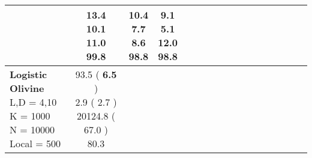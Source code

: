 \documentclass[9pt]{article}
\begin{document}
\begin{landscape}
\begin{longtable}{ l | c c c c | c c c c | c c c c | c c c c |}
             &
                            \makecell{              13.4
     \\
            {\footnotesize             10.1
    } \\  {\footnotesize             11.0
     } \\
            {\small \textcolor[rgb]{ 0.204 , 0.696 , 0.1} {99.8  }
} }
             &                         \makecell{              10.4
     \\
            {\footnotesize             7.7
    } \\  {\footnotesize             8.6
     } \\
            {\small \textcolor[rgb]{ 0.224 , 0.676 , 0.1} {98.8  }
} }
             &
                            \makecell{              9.1
     \\
            {\footnotesize             5.1
    } \\  {\footnotesize             12.0
     } \\
            {\small \textcolor[rgb]{ 0.224 , 0.676 , 0.1} {98.8  }
} }
            

 \\
                                                            
                    \hline
                    \makecell{ \textbf{ Logistic Olivine} \\
                    { \small L,D = 4,10} \\
                    {\small K = 1000} \\
                    {\small N = 10000 } \\ {\small Local = 500 }} &
                    
                            \makecell{              93.5
     (             \textbf{ 6.5 }
    ) \\
            {\footnotesize             2.9
     (              2.7
     )} \\
            {\footnotesize             20124.8
     (            67.0
    ) } \\
            {\small  \textcolor[rgb]{ 0.594 , 0.305 , 0.1} {80.3  }
} }



\end{longtable}
\end{landscape}
\end{document}
